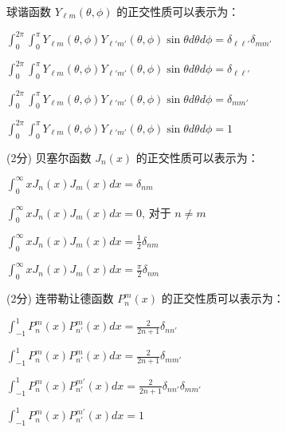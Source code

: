 \documentclass{njustexam}
\begin{document}
    \begin{problem}
        球谐函数 $Y_{\ell m}(\theta, \phi)$ 的正交性质可以表示为：
        \begin{abcd}
        \item $\int_{0}^{2\pi} \int_{0}^{\pi} Y_{\ell m}(\theta, \phi) Y_{\ell' m'}(\theta, \phi) \sin \theta d\theta d\phi = \delta_{\ell \ell'} \delta_{m m'}$
        \item $\int_{0}^{2\pi} \int_{0}^{\pi} Y_{\ell m}(\theta, \phi) Y_{\ell' m'}(\theta, \phi) \sin \theta d\theta d\phi = \delta_{\ell \ell'}$
        \item $\int_{0}^{2\pi} \int_{0}^{\pi} Y_{\ell m}(\theta, \phi) Y_{\ell' m'}(\theta, \phi) \sin \theta d\theta d\phi = \delta_{m m'}$
        \item $\int_{0}^{2\pi} \int_{0}^{\pi} Y_{\ell m}(\theta, \phi) Y_{\ell' m'}(\theta, \phi) \sin \theta d\theta d\phi = 1$
        \end{abcd}
        \end{problem}

        \begin{problem}{(2分)}
            贝塞尔函数 $J_n(x)$ 的正交性质可以表示为：
            \begin{abcd}
            \item $\int_{0}^{\infty} x J_n(x) J_m(x) dx = \delta_{nm}$
            \item $\int_{0}^{\infty} x J_n(x) J_m(x) dx = 0$, 对于 $n \neq m$
            \item $\int_{0}^{\infty} x J_n(x) J_m(x) dx = \frac{1}{2} \delta_{nm}$
            \item $\int_{0}^{\infty} x J_n(x) J_m(x) dx = \frac{\pi}{2} \delta_{nm}$
            \end{abcd}
            \end{problem}
    
            \begin{problem}{(2分)}
                连带勒让德函数 $P_n^m(x)$ 的正交性质可以表示为：
                \begin{abcd}
                \item $\int_{-1}^{1} P_n^m(x) P_{n'}^m(x) dx = \frac{2}{2n+1} \delta_{nn'}$
                \item $\int_{-1}^{1} P_n^m(x) P_{n'}^m(x) dx = \frac{2}{2n+1} \delta_{mm'}$
                \item $\int_{-1}^{1} P_n^m(x) P_{n'}^{m'}(x) dx = \frac{2}{2n+1} \delta_{nn'} \delta_{mm'}$
                \item $\int_{-1}^{1} P_n^m(x) P_{n'}^{m'}(x) dx = 1$
                \end{abcd}
                \end{problem}
                
\end{document}
